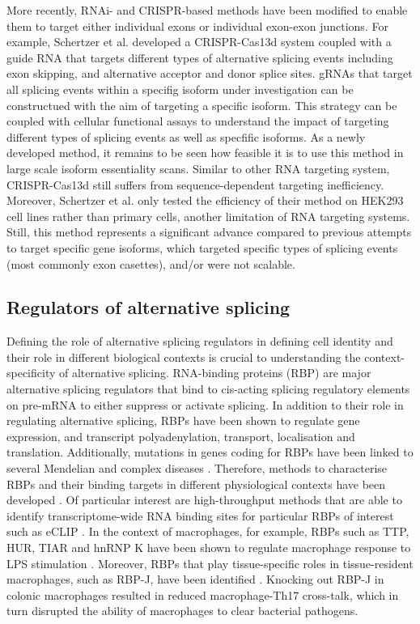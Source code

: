 More recently, RNAi- and CRISPR-based methods have been modified to enable them to target either individual exons or individual exon-exon junctions. For example, Schertzer et al. developed a CRISPR-Cas13d system coupled with a guide RNA that targets different types of alternative splicing events including exon skipping, and alternative acceptor and donor splice sites. gRNAs that target all splicing events within a specifig isoform under investigation can be constructued with the aim of targeting a specific isoform. This strategy can be coupled with cellular functional assays to understand the impact of targeting different types of splicing events as well as specfific isoforms. As a newly developed method, it remains to be seen how feasible it is to use this method in large scale isoform essentiality scans. Similar to other RNA targeting system, CRISPR-Cas13d still suffers from sequence-dependent targeting inefficiency. Moreover, Schertzer et al. only tested the efficiency of their method on HEK293 cell lines rather than primary cells, another limitation of RNA targeting systems. Still, this method represents a significant advance compared to previous attempts to target specific gene isoforms, which targeted specific types of splicing events (most commonly exon casettes), and/or were not scalable. 


\subsection{Regulators of alternative splicing}
Defining the role of alternative splicing regulators in defining cell identity and their role in different biological contexts is crucial to understanding the context-specificity of alternative splicing. RNA-binding proteins (RBP) are major alternative splicing regulators that bind to cis-acting splicing regulatory elements on pre-mRNA to either suppress or activate splicing. In addition to their role in regulating alternative splicing, RBPs have been shown to regulate gene expression, and transcript polyadenylation, transport, localisation and translation. Additionally, mutations in genes coding for RBPs have been linked to several Mendelian and complex diseases \cite{Nussbacher2015-zl,Castello2013-ml}. Therefore, methods to characterise RBPs and their binding targets in different physiological contexts have been developed \cite{Wang2012-ni,Wang2013-fb,Van_Nostrand2016-ky}. Of particular interest are high-throughput methods that are able to identify transcriptome-wide RNA binding sites for particular RBPs of interest such as eCLIP \cite{Van_Nostrand2016-ky}. In the context of macrophages, for example, RBPs such as TTP, HUR, TIAR and hnRNP K have been shown to regulate macrophage response to LPS stimulation \cite{Ostareck2019-rp}. Moreover, RBPs that play tissue-specific roles in tissue-resident macrophages, such as RBP-J, have been identified \cite{Kang2020-xl}. Knocking out RBP-J in colonic macrophages resulted in reduced macrophage-Th17 cross-talk, which in turn disrupted the ability of macrophages to clear bacterial pathogens. \\

